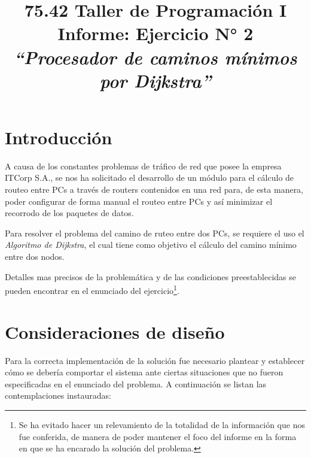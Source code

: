 \documentclass{article}
\begin{document}
\title{\Large 75.42 Taller de Programación I \\ 
	  \medskip\Huge Informe: Ejercicio N° 2  \\
	  \bigskip\Large\textit{``Procesador de caminos mínimos por Dijkstra''}}
\date{}
\maketitle




\section{Introducción}
	
	A causa de los constantes problemas de tráfico de red que posee la empresa ITCorp S.A., se nos ha solicitado el desarrollo de un módulo para el cálculo de routeo entre PCs a través de routers contenidos en una red para, de esta manera, poder configurar de forma manual el routeo entre PCs y así minimizar el recorrodo de los paquetes de datos.
	\par
	Para resolver el problema del camino de ruteo entre dos PCs, se requiere el uso el \textit{Algoritmo de Dijkstra}, el cual tiene como objetivo el cálculo del camino mínimo entre dos nodos.
	\par
	Detalles mas precisos de la problemática y de las condiciones preestablecidas se pueden encontrar en el enunciado del ejercicio\footnote{Se ha evitado hacer un relevamiento de la totalidad de la información que nos fue conferida, de manera de poder mantener el foco del informe en la forma en que se ha encarado la solución del problema.}.
\bigskip




\section{Consideraciones de diseño}

	Para la correcta implementación de la solución fue necesario plantear y establecer cómo se debería comportar el sistema ante ciertas situaciones que no fueron especificadas en el enunciado del problema. A continuación se listan las contemplaciones instauradas:
\end{document}
